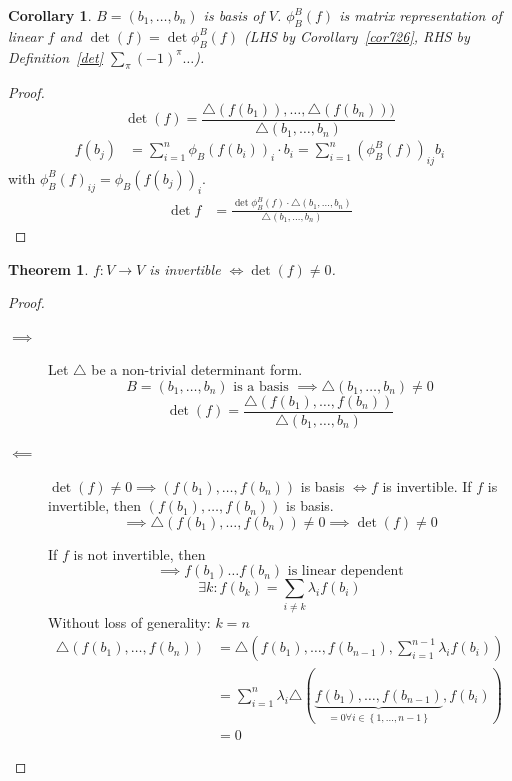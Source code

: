 \documentclass{article}
\newcounter{lecref}[section]
\numberwithin{lecref}{section}
\newtheorem{theorem}[lecref]{Theorem}
\newtheorem{corollary}[lecref]{Corollary}
\newcommand{\set}[1]{\left\{#1\right\}}
\begin{document}
\begin{corollary} %
  \label{cor:feqphif}
  $B = (b_1, \dots, b_n)$ is basis of $V$.
  $\phi_B^B(f)$ is matrix representation of linear $f$ and $\det(f) = \det\phi_B^B(f)$
  (LHS by Corollary~\ref{cor726}, RHS by Definition~\ref{det} $\sum_{\pi} (-1)^\pi \dots$).
\end{corollary}

\begin{proof}
  \[ \det(f) = \frac{\triangle(f(b_1)), \dots, \triangle(f(b_n)))}{\triangle (b_1, \dots, b_n)} \]
  \begin{align*}
    f(b_j) &= \sum_{i=1}^n \phi_B(f(b_i))_i \cdot b_i = \sum_{i=1}^n \left(\phi_B^B(f)\right)_{ij} b_i
  \end{align*}
  with $\phi_B^B(f)_{ij} = \phi_B(f(b_j))_i$.
  \begin{align*}
    \det{f} &= \frac{\det{\phi_B^B(f) \cdot \triangle(b_1, \dots, b_n)}}{\triangle(b_1, \dots, b_n)}
  \end{align*}
\end{proof}

\begin{theorem} %
  $f: V \to V$ is invertible $\iff \det(f) \neq 0$.
\end{theorem}
\begin{proof}
  \begin{description}
    \item[$\implies$] 
      Let $\triangle$ be a non-trivial determinant form.
      \[ B = (b_1, \dots, b_n) \text{ is a basis } \implies \triangle(b_1, \dots, b_n) \neq 0 \]
      \[ \det(f) = \frac{\triangle(f(b_1), \dots, f(b_n))}{\triangle(b_1, \dots, b_n)} \]
    \item[$\impliedby$]
      $\det(f) \neq 0 \implies (f(b_1), \dots, f(b_n))$ is basis $\iff f$ is invertible.
      If $f$ is invertible, then $(f(b_1), \dots, f(b_n))$ is basis.
      \[ \implies \triangle (f(b_1), \dots, f(b_n)) \neq 0 \implies \det(f) \neq 0 \]

      If $f$ is not invertible, then
      \[ \implies f(b_1) \dots f(b_n) \text{ is linear dependent} \]
      \[ \exists k: f(b_k) = \sum_{i\neq k} \lambda_i f(b_i) \]
      Without loss of generality: $k = n$
      \begin{align*}
        \triangle(f(b_1), \dots, f(b_n)) &= \triangle(f(b_1), \dots, f(b_{n-1}), \sum_{i=1}^{n-1} \lambda_i f(b_i)) \\
          &= \sum_{i=1}^n \lambda_i \triangle(\underbrace{f(b_1), \dots, f(b_{n-1})}_{=0 \forall i \in \set{1,\dots,n-1}}, f(b_i)) \\
          &= 0
      \end{align*}
  \end{description}
\end{proof}
\end{document}
